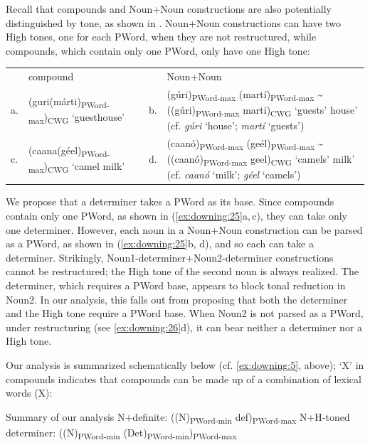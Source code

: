 \documentclass[output=paper]{langscibook}
\begin{document}
Recall that compounds and Noun+Noun constructions are also potentially distinguished by tone, as shown in . Noun+Noun constructions can have two High tones, one for each PWord, when they are not restructured, while compounds, which contain only one PWord, only have one High tone:

\ea\label{ex:downing:25}
\begin{tabular}[t]{@{}l>{\raggedright}p{4.5cm}l>{\raggedright\arraybackslash}p{4.5cm}@{}}
 & compound & &  Noun+Noun\\
a.& (guri(márti)\textsubscript{PWord-max})\textsubscript{CWG} ‘guesthouse’  & b. & (gúri)\textsubscript{PWord-max} (martí)\textsubscript{PWord-max} {\textasciitilde} ((gúri)\textsubscript{PWord-max} marti)\textsubscript{CWG} ‘guests’ house’ (cf. \textit{gúri} ‘house’; \textit{martí} ‘guests’)\\
c.& (caana(géel)\textsubscript{PWord-max})\textsubscript{CWG}  ‘camel milk’ & d. & (caanó)\textsubscript{PWord-max} (geél)\textsubscript{PWord-max} {\textasciitilde} ((caanó)\textsubscript{PWord-max} geel)\textsubscript{CWG} ‘camels’ milk’ (cf. \textit{caanó} ‘milk’; \textit{géel} ‘camels’)\\
\end{tabular}
\z 

We propose that a determiner takes a PWord as its base. Since compounds contain only one PWord, as shown in (\ref{ex:downing:25}a,\,c), they can take only one determiner. However, each noun in a Noun+Noun construction can be parsed as a PWord, as shown in (\ref{ex:downing:25}b, d), and so each can take a determiner. Strikingly, Noun1-determiner+Noun2-determiner constructions cannot be restructured; the High tone of the second noun is always realized. The determiner, which requires a PWord base, appears to block tonal reduction in Noun2. In our analysis, this falls out from proposing that both the determiner and the High tone require a PWord base. When Noun2 is not parsed as a PWord, under restructuring (see \ref{ex:downing:26}d), it can bear neither a determiner nor a High tone.

Our analysis is summarized schematically below (cf. \ref{ex:downing:5}, above); ‘X’ in compounds indicates that compounds can be made up of a combination of lexical words (X):


\ea Summary of our analysis  \label{ex:downing:26}
\ea N+definite:        ((N)\textsubscript{PWord-min} def)\textsubscript{PWord-max}
\ex N+H-toned determiner:  ((N)\textsubscript{PWord-min} (Det)\textsubscript{PWord-min})\textsubscript{PWord-max} 
\end{document}
